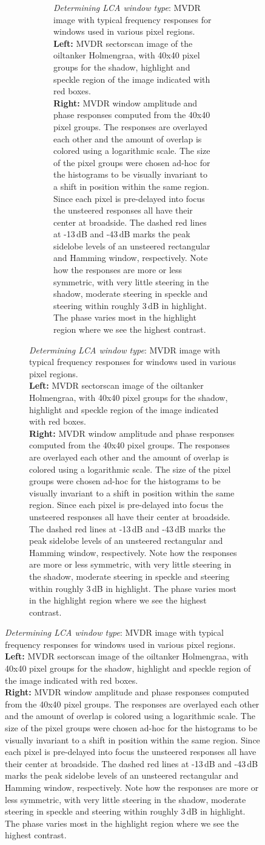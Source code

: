 \begin{figure}[tbp]
\begin{figure}[tbp]
\ifPhdDoc
   \begin{figure}[t]\centering%
   \caption{\emph{Determining LCA window type}: MVDR image with typical frequency responses for windows used in various pixel regions.\\[.5\baselineskip]
   \textbf{Left:} MVDR sectorscan image of the oiltanker Holmengraa, with 40x40 pixel groups for the shadow, highlight and speckle region of the image indicated with red boxes.\\[.5\baselineskip]
   \textbf{Right:} MVDR window amplitude and phase responses computed from the 40x40 pixel groups. The responses are overlayed each other and the amount of overlap is colored using a logarithmic scale. The size of the pixel groups were chosen ad-hoc for the histograms to be visually invariant to a shift in position within the same region. Since each pixel is pre-delayed into focus the unsteered responses all have their center at broadside. The dashed red lines at -13\,dB and -43\,dB marks the peak sidelobe levels of an unsteered rectangular and Hamming window, respectively. Note how the responses are more or less symmetric, with very little steering in the shadow, moderate steering in speckle and steering within roughly 3\,dB in highlight. The phase varies most in the highlight region where we see the highest contrast.}\label{III_mvdr_selected_windows}
\else
\setcounter{topnumber}{1}
\setcounter{dbltopnumber}{1}


\end{figure}
\end{figure}
\end{figure}
